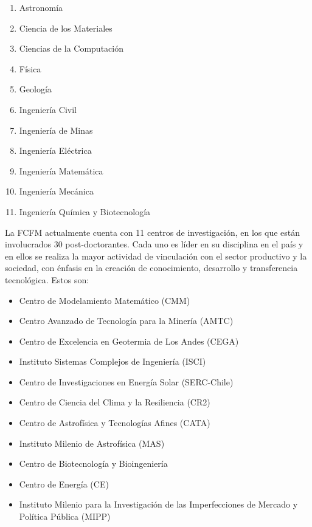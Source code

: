 \begin{enumerate}
\item Astronomía
\item Ciencia de los Materiales
\item Ciencias de la Computación
\item Física
\item Geología
\item Ingeniería Civil
\item Ingeniería de Minas
\item Ingeniería Eléctrica
\item Ingeniería Matemática
\item Ingeniería Mecánica
\item Ingeniería Química y Biotecnología
\end{enumerate}

La FCFM actualmente cuenta con 11 centros de investigación, en los que están involucrados
30 post-doctorantes.
Cada uno es líder en su disciplina en el país y en ellos se realiza la mayor actividad
de vinculación con el sector productivo y la sociedad, con énfasis en la creación de conocimiento,
desarrollo y transferencia tecnológica. Estos son:

\begin{itemize}
\item Centro de Modelamiento Matemático (CMM)
\item Centro Avanzado de Tecnología para la Minería (AMTC)
\item Centro de Excelencia en Geotermia de Los Andes (CEGA)
\item Instituto Sistemas Complejos de Ingeniería (ISCI)
\item Centro de Investigaciones en Energía Solar (SERC-Chile)
\item Centro de Ciencia del Clima y la Resiliencia (CR2)
\item Centro de Astrofísica y Tecnologías Afines (CATA)
\item Instituto Milenio de Astrofísica (MAS)
\item Centro de Biotecnología y Bioingeniería
\item Centro de Energía (CE)
\item Instituto Milenio para la Investigación de las Imperfecciones de Mercado y Política Pública (MIPP)
\end{itemize}

